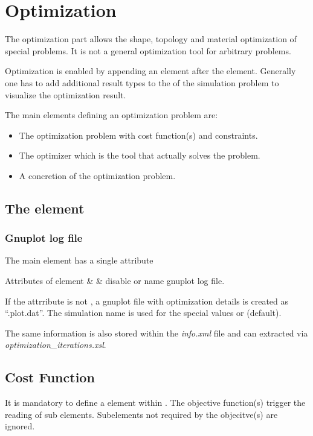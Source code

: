 \chapter{Optimization}
The optimization part allows the shape, topology and material optimization of special problems. It is not a general optimization tool for arbitrary problems.

Optimization is enabled by appending an  element after
the  element. Generally one has to add additional result types
to the  of the simulation problem to visualize the optimization result.

The main elements defining an optimization problem are:
\begin{itemize}
  \item The optimization problem with cost function(s) and constraints.
  \item The optimizer which is the tool that actually solves the problem.
  \item A concretion of the optimization problem.
\end{itemize}

\section{The  element}
\label{sec:optimization}
\subsection{Gnuplot log file}
The main element  has a single attribute

\begin{xatlist} {Attributes of  element}
 &  & disable or name gnuplot log file.
\end{xatlist}

If the attrribute is not , a gnuplot file with optimization
details is created as ``.plot.dat''. The simulation name is
used for the special values  or \xatv{[problem]} (default).

The same information is also stored within the \textit{info.xml} file and can 
extracted via \textit{optimization\_iterations.xsl}.

\section{Cost Function}
\label{sec:cost_function}
It is mandatory to define a  element within
. The objective function(s) trigger the reading of sub elements. Subelements not required by the objecitve(s) are ignored.

